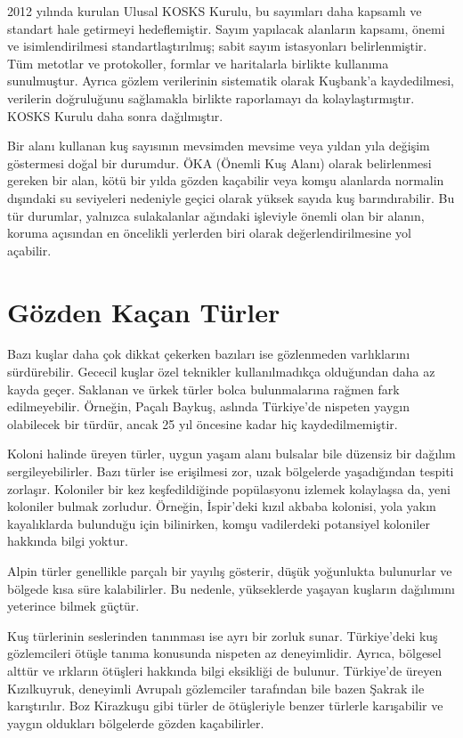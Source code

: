 \documentclass[
  a4paper,
  DIV=11,
  numbers=noendperiod]{scrartcl}
\begin{document}
2012 yılında kurulan Ulusal KOSKS Kurulu, bu sayımları daha kapsamlı ve
standart hale getirmeyi hedeflemiştir. Sayım yapılacak alanların
kapsamı, önemi ve isimlendirilmesi standartlaştırılmış; sabit sayım
istasyonları belirlenmiştir. Tüm metotlar ve protokoller, formlar ve
haritalarla birlikte kullanıma sunulmuştur. Ayrıca gözlem verilerinin
sistematik olarak Kuşbank'a kaydedilmesi, verilerin doğruluğunu
sağlamakla birlikte raporlamayı da kolaylaştırmıştır. KOSKS Kurulu daha
sonra dağılmıştır.

Bir alanı kullanan kuş sayısının mevsimden mevsime veya yıldan yıla
değişim göstermesi doğal bir durumdur. ÖKA (Önemli Kuş Alanı) olarak
belirlenmesi gereken bir alan, kötü bir yılda gözden kaçabilir veya
komşu alanlarda normalin dışındaki su seviyeleri nedeniyle geçici olarak
yüksek sayıda kuş barındırabilir. Bu tür durumlar, yalnızca sulakalanlar
ağındaki işleviyle önemli olan bir alanın, koruma açısından en öncelikli
yerlerden biri olarak değerlendirilmesine yol açabilir.

\section*{Gözden Kaçan Türler}\label{guxf6zden-kauxe7an-tuxfcrler}


Bazı kuşlar daha çok dikkat çekerken bazıları ise gözlenmeden
varlıklarını sürdürebilir. Gececil kuşlar özel teknikler kullanılmadıkça
olduğundan daha az kayda geçer. Saklanan ve ürkek türler bolca
bulunmalarına rağmen fark edilmeyebilir. Örneğin, Paçalı Baykuş, aslında
Türkiye'de nispeten yaygın olabilecek bir türdür, ancak 25 yıl öncesine
kadar hiç kaydedilmemiştir.

Koloni halinde üreyen türler, uygun yaşam alanı bulsalar bile düzensiz
bir dağılım sergileyebilirler. Bazı türler ise erişilmesi zor, uzak
bölgelerde yaşadığından tespiti zorlaşır. Koloniler bir kez
keşfedildiğinde popülasyonu izlemek kolaylaşsa da, yeni koloniler bulmak
zorludur. Örneğin, İspir'deki kızıl akbaba kolonisi, yola yakın
kayalıklarda bulunduğu için bilinirken, komşu vadilerdeki potansiyel
koloniler hakkında bilgi yoktur.

Alpin türler genellikle parçalı bir yayılış gösterir, düşük yoğunlukta
bulunurlar ve bölgede kısa süre kalabilirler. Bu nedenle, yükseklerde
yaşayan kuşların dağılımını yeterince bilmek güçtür.

Kuş türlerinin seslerinden tanınması ise ayrı bir zorluk sunar.
Türkiye'deki kuş gözlemcileri ötüşle tanıma konusunda nispeten az
deneyimlidir. Ayrıca, bölgesel alttür ve ırkların ötüşleri hakkında
bilgi eksikliği de bulunur. Türkiye'de üreyen Kızılkuyruk, deneyimli
Avrupalı gözlemciler tarafından bile bazen Şakrak ile karıştırılır. Boz
Kirazkuşu gibi türler de ötüşleriyle benzer türlerle karışabilir ve
yaygın oldukları bölgelerde gözden kaçabilirler.
\end{document}
